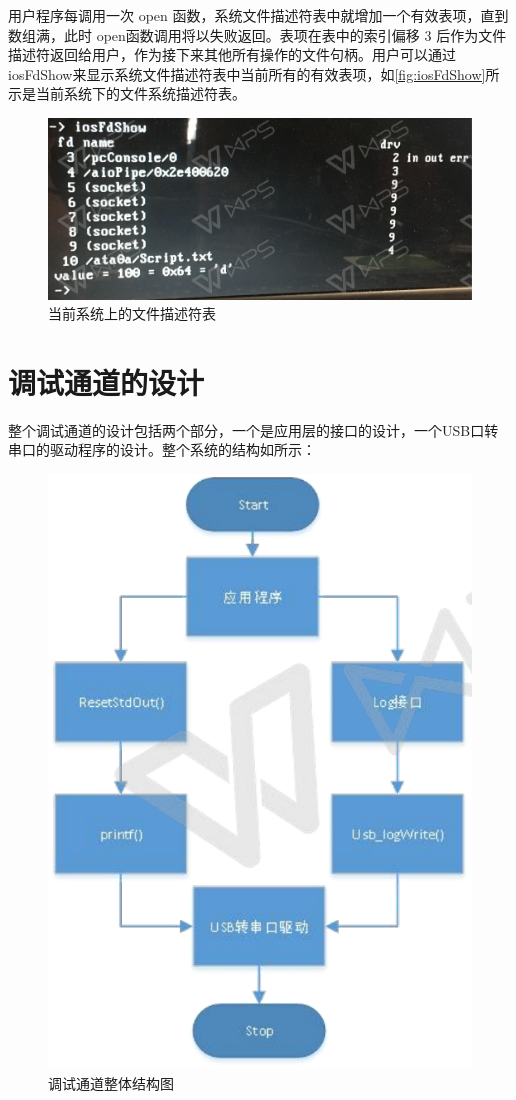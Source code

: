 用户程序每调用一次 open 函数，系统文件描述符表中就增加一个有效表项，直到数组满，此时 open函数调用将以失败返回。表项在表中的索引偏移 3 后作为文件描述符返回给用户，作为接下来其他所有操作的文件句柄。用户可以通过iosFdShow来显示系统文件描述符表中当前所有的有效表项，如\autoref{fig:iosFdShow}所示是当前系统下的文件系统描述符表。
\begin{figure}[!h]
\centering
\includegraphics[width=.9\textwidth]{./graphics/iosFdShow.pdf}
\caption{当前系统上的文件描述符表}\label{fig:iosFdShow}
\end{figure}



\section{调试通道的设计}
	整个调试通道的设计包括两个部分，一个是应用层的接口的设计，一个USB口转串口的驱动程序的设计。整个系统的结构如所示：
\begin{figure}[!h]
\centering
\includegraphics[width=.7\textwidth]{./graphics/system-structure-diagram.pdf}
\caption{调试通道整体结构图}\label{fig:调试通道结构图}
\end{figure}


